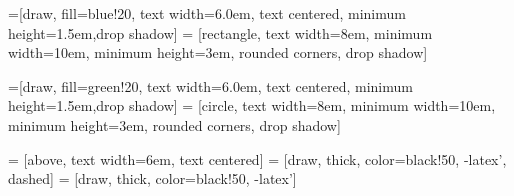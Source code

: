 \usetikzlibrary{shadows,arrows}
 
=[draw, fill=blue!20, text width=6.0em, text centered,
  minimum height=1.5em,drop shadow]
 = [rectangle, text width=8em, minimum width=10em,
  minimum height=3em, rounded corners, drop shadow]

=[draw, fill=green!20, text width=6.0em, text centered,
  minimum height=1.5em,drop shadow]
 = [circle, text width=8em, minimum width=10em,
  minimum height=3em, rounded corners, drop shadow]
 
 = [above, text width=6em, text centered]
 = [draw, thick, color=black!50, -latex', dashed]
 = [draw, thick, color=black!50, -latex']
 

\newcommand{\practica}[2]{node (p#1) [practica] {#2}}
\newcommand{\implemented}[2]{node (p#1) [interface] {#2}}

\newcommand{\background}[5]{%
  \begin{pgfonlayer}{background}
    \path (#1.west |- #2.north)+(-0.5,0.5) node (a1) {};
    \path (#3.east |- #4.south)+(+0.5,-0.25) node (a2) {};
    \path[fill=yellow!20,rounded corners, draw=black!50, dashed]
      (a1) rectangle (a2);
    \path (a1.east |- a1.south)+(0.8,-0.3) node (u1)[texto]
      {\scriptsize\textit{#5}};
  \end{pgfonlayer}}

\newcommand{\transreceptor}[3]{%
  \path [linepart] (#1.east) -- node [above]
    {\scriptsize Transreceptor #2} (#3);}

